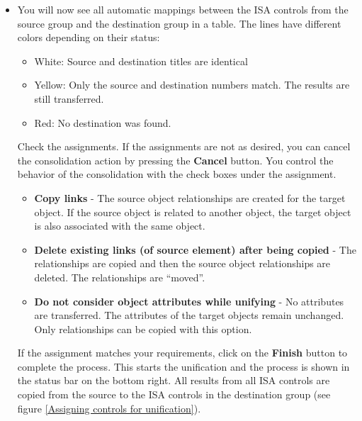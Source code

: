 \documentclass[a4paper,10pt]{book}
\begin{document}
\begin{itemize}
 \item You will now see all automatic mappings between the ISA controls from the source group and the
  destination group in a table. The lines have different colors depending on their status:
  \begin{itemize}
   \item White: Source and destination titles are identical
   \item Yellow: Only the source and destination numbers match. The results are still transferred.
   \item Red: No destination was found.
  \end{itemize}
Check the assignments. If the assignments are not as desired, you can cancel the consolidation action by pressing the \textbf{Cancel}
button.
You control the behavior of the consolidation with the check boxes under the assignment.
\begin{itemize}
 \item \textbf{Copy links} - The source object relationships are created for the target object. If the source object is related to another object, the target object is also associated with the same object.
 \item \textbf{Delete existing links (of source element) after being copied} - The relationships are copied and then the source object relationships are deleted. The relationships are ``moved''.
 \item \textbf{Do not consider object attributes while unifying} - No attributes are transferred. The attributes of the target objects remain unchanged. Only relationships can be copied with this option.
\end{itemize}
If the assignment matches your requirements, click on the \textbf{Finish} button to complete the process.
This starts the unification and the process is shown in the status bar on the bottom right. All results from all
ISA controls are copied from the source to the ISA controls in the destination group (see figure \ref{Assigning controls for unification}).
\end{itemize}
\end{document}
